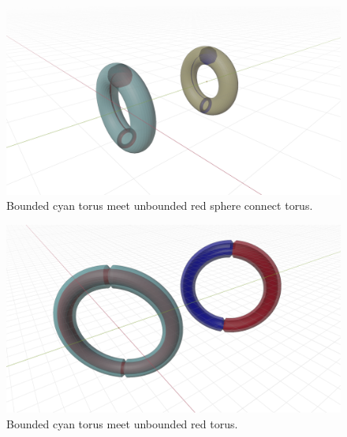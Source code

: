 \documentclass[a4paper]{book}
\numberwithin{equation}{chapter}
\theoremstyle{definition}
\begin{document}
\begin{figure}
    \caption{Bounded cyan torus meet unbounded red sphere connect torus.}
    \includegraphics[width = 18cm]{fig/s3s5.png}
\end{figure}

\begin{figure}
    \caption{Bounded cyan torus meet unbounded red torus.}
    \includegraphics[width = 18cm]{fig/s3s6.png}
\end{figure}


\end{document}
